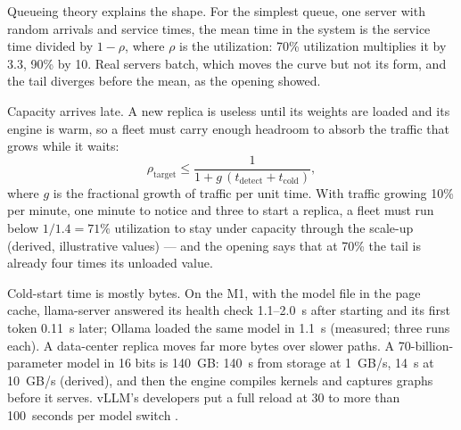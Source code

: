 

Queueing theory explains the shape. For the simplest queue, one server with
random arrivals and service times, the mean time in the system is the service
time divided by $1 - \rho$, where $\rho$ is the utilization: 70\% utilization
multiplies it by 3.3, 90\% by 10. Real servers batch, which moves the curve but
not its form, and the tail diverges before the mean, as the opening showed.

Capacity arrives late. A new replica is useless until its weights are loaded
and its engine is warm, so a fleet must carry enough headroom to absorb the
traffic that grows while it waits:
\begin{equation}
\rho_{\text{target}} \le \frac{1}{1 + g\,(t_{\text{detect}} + t_{\text{cold}})},
\label{eq:headroom}
\end{equation}
where $g$ is the fractional growth of traffic per unit time. With traffic
growing 10\% per minute, one minute to notice and three to start a replica, a
fleet must run below $1/1.4 = 71\%$ utilization to stay under capacity through
the scale-up (derived, illustrative values) --- and the opening says that at
70\% the tail is already four times its unloaded value.

Cold-start time is mostly bytes. On the M1, with the model file in the page
cache, llama-server answered its health check 1.1--2.0~s after starting and its
first token 0.11~s later; Ollama loaded the same model in 1.1~s (measured; three
runs each). A data-center replica moves far more bytes over slower paths. A
70-billion-parameter model in 16 bits is 140~GB: 140~s from storage at 1~GB/s,
14~s at 10~GB/s (derived), and then the engine compiles kernels and captures
graphs before it serves. vLLM's developers put a full reload at 30 to more than
100~seconds per model switch \cite{vllm2025sleepmode}.

